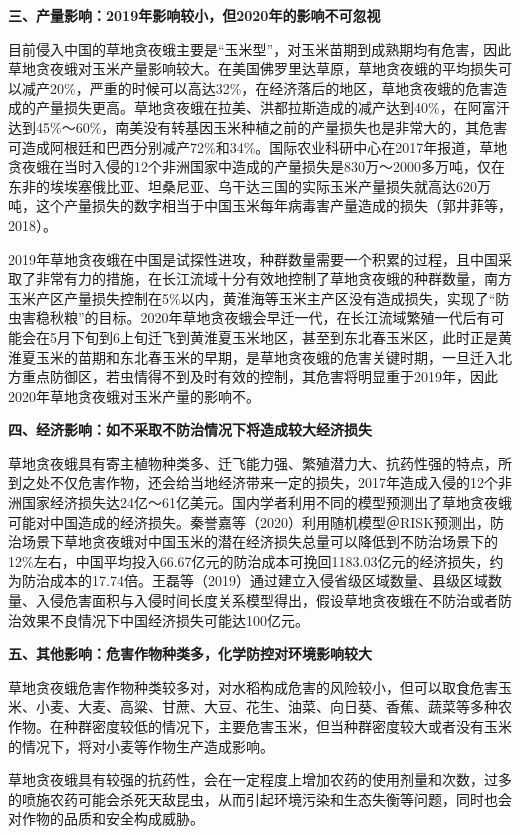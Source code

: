 \documentclass{progbookcn}
\begin{document}
\textbf{三、产量影响：2019年影响较小，但2020年的影响不可忽视}

目前侵入中国的草地贪夜蛾主要是“玉米型”，对玉米苗期到成熟期均有危害，因此草地贪夜蛾对玉米产量影响较大。在美国佛罗里达草原，草地贪夜蛾的平均损失可以减产20\%，严重的时候可以高达32\%，在经济落后的地区，草地贪夜蛾的危害造成的产量损失更高。草地贪夜蛾在拉美、洪都拉斯造成的减产达到40\%，在阿富汗达到45\%～60\%，南美没有转基因玉米种植之前的产量损失也是非常大的，其危害可造成阿根廷和巴西分别减产72\%和34\%。国际农业科研中心在2017年报道，草地贪夜蛾在当时入侵的12个非洲国家中造成的产量损失是830万～2000多万吨，仅在东非的埃埃塞俄比亚、坦桑尼亚、乌干达三国的实际玉米产量损失就高达620万吨，这个产量损失的数字相当于中国玉米每年病毒害产量造成的损失（郭井菲等，2018）。

2019年草地贪夜蛾在中国是试探性进攻，种群数量需要一个积累的过程，且中国采取了非常有力的措施，在长江流域十分有效地控制了草地贪夜蛾的种群数量，南方玉米产区产量损失控制在5\%以内，黄淮海等玉米主产区没有造成损失，实现了“防虫害稳秋粮”的目标。2020年草地贪夜蛾会早迁一代，在长江流域繁殖一代后有可能会在5月下旬到6上旬迁飞到黄淮夏玉米地区，甚至到东北春玉米区，此时正是黄淮夏玉米的苗期和东北春玉米的早期，是草地贪夜蛾的危害关键时期，一旦迁入北方重点防御区，若虫情得不到及时有效的控制，其危害将明显重于2019年，因此2020年草地贪夜蛾对玉米产量的影响不。

\textbf{四、经济影响：如不采取不防治情况下将造成较大经济损失}

草地贪夜蛾具有寄主植物种类多、迁飞能力强、繁殖潜力大、抗药性强的特点，所到之处不仅危害作物，还会给当地经济带来一定的损失，2017年造成入侵的12个非洲国家经济损失达24亿～61亿美元。国内学者利用不同的模型预测出了草地贪夜蛾可能对中国造成的经济损失。秦誉嘉等（2020）利用随机模型＠RISK预测出，防治场景下草地贪夜蛾对中国玉米的潜在经济损失总量可以降低到不防治场景下的12\%左右，中国平均投入66.67亿元的防治成本可挽回1183.03亿元的经济损失，约为防治成本的17.74倍。王磊等（2019）通过建立入侵省级区域数量、县级区域数量、入侵危害面积与入侵时间长度关系模型得出，假设草地贪夜蛾在不防治或者防治效果不良情况下中国经济损失可能达100亿元。

\textbf{五、其他影响：危害作物种类多，化学防控对环境影响较大}

草地贪夜蛾危害作物种类较多对，对水稻构成危害的风险较小，但可以取食危害玉米、小麦、大麦、高粱、甘蔗、大豆、花生、油菜、向日葵、香蕉、蔬菜等多种农作物。在种群密度较低的情况下，主要危害玉米，但当种群密度较大或者没有玉米的情况下，将对小麦等作物生产造成影响。

草地贪夜蛾具有较强的抗药性，会在一定程度上增加农药的使用剂量和次数，过多的喷施农药可能会杀死天敌昆虫，从而引起环境污染和生态失衡等问题，同时也会对作物的品质和安全构成威胁。
\end{document}
